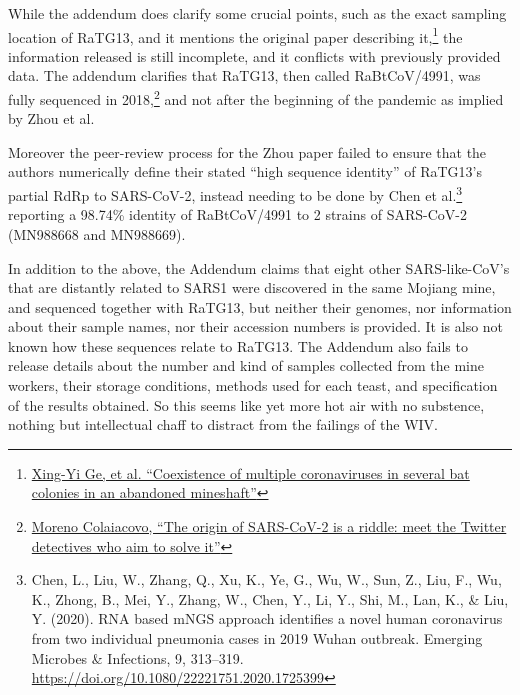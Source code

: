 \documentclass[11pt]{article}
\begin{document}
While the addendum does clarify some crucial points, such as the exact sampling location of RaTG13, and it mentions the original paper describing it,\footnote{\href{https://link.springer.com/article/10.1007\%2Fs12250-016-3713-9}{Xing-Yi Ge, et al. ``Coexistence of multiple coronaviruses in several bat colonies in an abandoned mineshaft''}} the information released is still incomplete, and it conflicts with previously provided data. The addendum clarifies that RaTG13, then called RaBtCoV/4991, was fully sequenced in 2018,\footnote{\href{https://mygenomix.medium.com/the-origin-of-sars-cov-2-is-a-riddle-meet-the-twitter-detectives-who-aim-to-solve-it-5050216fd279}{Moreno Colaiacovo, ``The origin of SARS-CoV-2 is a riddle: meet the Twitter detectives who aim to solve it''}} and not after the beginning of the pandemic as implied by Zhou et al.

Moreover the peer-review process for the Zhou paper failed to ensure that the authors numerically define their stated ``high sequence identity'' of RaTG13's partial RdRp to SARS-CoV-2, instead needing to be done by Chen et al.\footnote{Chen, L., Liu, W., Zhang, Q., Xu, K., Ye, G., Wu, W., Sun, Z., Liu, F., Wu, K., Zhong, B., Mei, Y., Zhang, W., Chen, Y., Li, Y., Shi, M., Lan, K., \& Liu, Y. (2020). RNA based mNGS approach identifies a novel human coronavirus from two individual pneumonia cases in 2019 Wuhan outbreak. Emerging Microbes \& Infections, 9, 313–319. \url{https://doi.org/10.1080/22221751.2020.1725399}} reporting a 98.74\% identity of RaBtCoV/4991 to 2 strains of SARS-CoV-2 (MN988668 and MN988669).

In addition to the above, the Addendum claims that eight other SARS-like-CoV's that are distantly related to SARS1 were discovered in the same Mojiang mine, and sequenced together with RaTG13, but neither their genomes, nor information about their sample names, nor their accession numbers is provided. It is also not known how these sequences relate to RaTG13. The Addendum also fails to release details about the number and kind of samples collected from the mine workers, their storage conditions, methods used for each teast, and specification of the results obtained. So this seems like yet more hot air with no substence, nothing but intellectual chaff to distract from the failings of the WIV.
\end{document}
